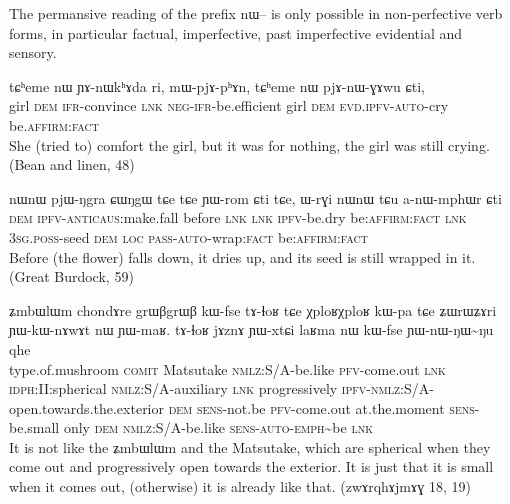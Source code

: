 \documentclass[oldfontcommands,oneside,a4paper,11pt]{article}
\newcommand{\ipa}[1]{{\phon \mbox{#1}}} %
\begin{document}
The permansive reading of the prefix \ipa{nɯ--} is only possible in non-perfective verb forms, in particular factual, imperfective, past imperfective evidential and sensory.


\begin{exe}
\ex \label{ex:pjAnWGAwu}
\gll
\ipa{tɕʰeme} 	\ipa{nɯ} 	\ipa{ɲɤ-nɯkʰɤda} 	\ipa{ri,} 	\ipa{mɯ-pjɤ-pʰɤn,} 	\ipa{tɕʰeme} 	\ipa{nɯ} 	\ipa{pjɤ-nɯ-ɣɤwu} 	\ipa{ɕti,} \\
girl \textsc{dem} \textsc{ifr}-convince \textsc{lnk} \textsc{neg-ifr}-be.efficient girl \textsc{dem} \textsc{evd.ipfv-auto}-cry  be.\textsc{affirm:fact} \\
\glt She (tried to) comfort the girl, but it was for nothing, the girl was still crying. (Bean and linen, 48)
\end{exe} 

\begin{exe}
\ex \label{ex:anWmphWr}
\gll
\ipa{nɯnɯ} 	\ipa{pjɯ-ŋgra} 	\ipa{ɕɯŋgɯ} 	\ipa{tɕe} 	\ipa{tɕe} 	\ipa{ɲɯ-rom} 	\ipa{ɕti} 	\ipa{tɕe,} 	\ipa{ɯ-rɣi} 	\ipa{nɯnɯ} 	\ipa{tɕu} 	\ipa{a-nɯ-mphɯr} 	\ipa{ɕti} \\
\textsc{dem} \textsc{ipfv-anticaus}:make.fall before \textsc{lnk}  \textsc{lnk} \textsc{ipfv}-be.dry be\textsc{:affirm:fact} \textsc{lnk} \textsc{3sg.poss}-seed \textsc{dem} \textsc{loc} \textsc{pass-auto}-wrap:\textsc{fact} be\textsc{:affirm:fact} \\
\glt Before (the flower) falls down, it dries up, and its seed is still wrapped in it. (Great Burdock, 59)
\end{exe} 


\begin{exe}
 \ex \label{ex:YWnWNWNu}
 \gll
\ipa{ʑmbɯlɯm}	\ipa{chondɤre}  	\ipa{grɯβgrɯβ}  	\ipa{kɯ-fse}  	\ipa{tɤ-ɬoʁ}  	\ipa{tɕe}  	\ipa{χploʁχploʁ}  	\ipa{kɯ-pa}  
\ipa{tɕe}  	\ipa{ʑɯrɯʑɤri}  	\ipa{ɲɯ-kɯ-nɤwɤt}  	\ipa{nɯ}  	\ipa{ɲɯ-maʁ.}  
\ipa{tɤ-ɬoʁ}  	\ipa{jɤznɤ}  	\ipa{ɲɯ-xtɕi}  	\ipa{laʁma}  	\ipa{nɯ}  	\ipa{kɯ-fse}  	\ipa{ɲɯ-nɯ-ŋɯ\textasciitilde{}ŋu}  	\ipa{qhe}  	\\
type.of.mushroom \textsc{comit} Matsutake \textsc{nmlz}:S/A-be.like \textsc{pfv}-come.out \textsc{lnk} \textsc{idph:II:}spherical \textsc{nmlz}:S/A-auxiliary \textsc{lnk} progressively \textsc{ipfv}-\textsc{nmlz}:S/A-open.towards.the.exterior \textsc{dem} \textsc{sens}-not.be  \textsc{pfv}-come.out at.the.moment \textsc{sens}-be.small only \textsc{dem} \textsc{nmlz}:S/A-be.like \textsc{sens-auto}-\textsc{emph}\textasciitilde{}be \textsc{lnk} \\
\glt It is not like the \ipa{ʑmbɯlɯm} and the Matsutake, which are spherical when they come out and progressively open towards the exterior. It is just that it is small when it comes out, (otherwise) it is already like that.
 (\ipa{zwɤrqhɤjmɤɣ} 18, 19)
 \end{exe}
\end{document}
